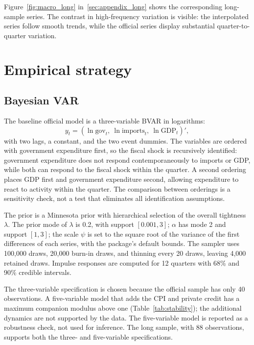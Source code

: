 \documentclass[11pt,a4paper]{article}
\begin{document}
Figure~\ref{fig:macro_long} in~\ref{sec:appendix_long} shows the corresponding long-sample series. The contrast in high-frequency variation is visible: the interpolated series follow smooth trends, while the official series display substantial quarter-to-quarter variation.

\section{Empirical strategy}
\label{sec:method}

\subsection{Bayesian VAR}
\label{sec:bvar}

The baseline official model is a three-variable BVAR in logarithms:
\[
y_t = \left(\ln \text{gov}_t,\ \ln \text{imports}_t,\ \ln \text{GDP}_t\right)' ,
\]
with two lags, a constant, and the two event dummies. The variables are ordered with government expenditure first, so the fiscal shock is recursively identified: government expenditure does not respond contemporaneously to imports or GDP, while both can respond to the fiscal shock within the quarter. A second ordering places GDP first and government expenditure second, allowing expenditure to react to activity within the quarter. The comparison between orderings is a sensitivity check, not a test that eliminates all identification assumptions.

The prior is a Minnesota prior with hierarchical selection of the overall tightness $\lambda$. The prior mode of $\lambda$ is 0.2, with support $[0.001,3]$; $\alpha$ has mode 2 and support $[1,3]$; the scale $\psi$ is set to the square root of the variance of the first differences of each series, with the package's default bounds. The sampler uses 100,000 draws, 20,000 burn-in draws, and thinning every 20 draws, leaving 4,000 retained draws. Impulse responses are computed for 12 quarters with 68\% and 90\% credible intervals.

The three-variable specification is chosen because the official sample has only 40 observations. A five-variable model that adds the CPI and private credit has a maximum companion modulus above one (Table~\ref{tab:stability}); the additional dynamics are not supported by the data. The five-variable model is reported as a robustness check, not used for inference. The long sample, with 88 observations, supports both the three- and five-variable specifications.
\end{document}
